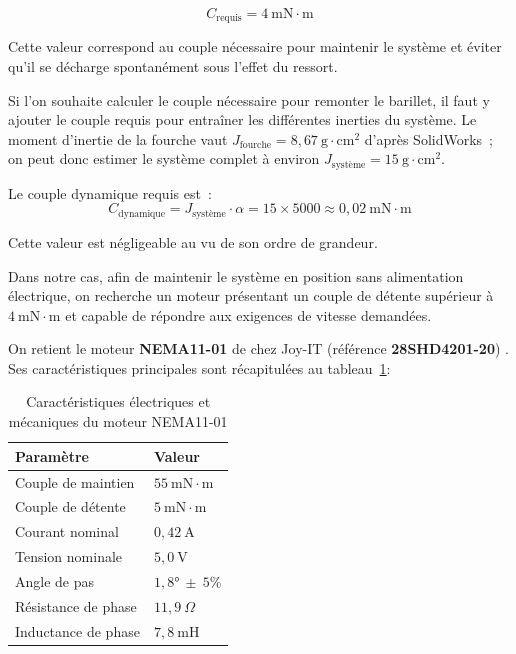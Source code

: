\begin{equation}
  C_\text{requis} = 4\ \mathrm{mN{\cdot}m}
  \label{eq:couple_requis}
\end{equation}

Cette valeur correspond au couple nécessaire pour maintenir le système et éviter
qu'il se décharge spontanément sous l'effet du ressort.

Si l'on souhaite calculer le couple nécessaire pour remonter le barillet, il faut
y ajouter le couple requis pour entraîner les différentes inerties du système.
Le moment d'inertie de la fourche vaut $J_\text{fourche} = 8{,}67\ \mathrm{g{\cdot}cm^2}$
d'après SolidWorks~; on peut donc estimer le système complet à environ
$J_\text{système} = 15\ \mathrm{g{\cdot}cm^2}$.

Le couple dynamique requis est~:
\begin{equation}
  C_\text{dynamique} = J_\text{système} \cdot \alpha = 15 \times 5000 \approx 0{,}02\ \mathrm{mN{\cdot}m}
  \label{eq:couple_dynamique}
\end{equation}

Cette valeur est négligeable au vu de son ordre de grandeur.

Dans notre cas, afin de maintenir le système en position sans alimentation
électrique, on recherche un moteur présentant un couple de détente supérieur
à $4\ \mathrm{mN{\cdot}m}$ et capable de répondre aux exigences de vitesse
demandées.

On retient le moteur \textbf{NEMA11-01} de chez Joy-IT (référence
\textbf{28SHD4201-20}) \cite{moons_nema11, joytechnik_nema11_01}. Ses caractéristiques principales
sont récapitulées au tableau~\ref{tab:specs_moteur}:

\begin{table}[H]
  \centering
  \caption{Caractéristiques électriques et mécaniques du moteur NEMA11-01}
  \label{tab:specs_moteur}
  \begin{tabular}{ll}
    \toprule
    \textbf{Paramètre} & \textbf{Valeur} \\
    \midrule
    Couple de maintien & $55\ \mathrm{mN{\cdot}m}$ \\
    Couple de détente & $5\ \mathrm{mN{\cdot}m}$ \\
    Courant nominal & $0{,}42\ \mathrm{A}$ \\
    Tension nominale & $5{,}0\ \mathrm{V}$ \\
    Angle de pas & $1{,}8°\ \pm\ 5\%$ \\
    Résistance de phase & $11{,}9\ \Omega$ \\
    Inductance de phase & $7{,}8\ \mathrm{mH}$ \\
    \bottomrule
  \end{tabular}
\end{table}

